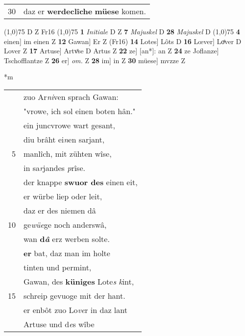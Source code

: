 \documentclass[8pt,a4paper,notitlepage]{article}
\begin{document}
\begin{table}[ht]
\begin{minipage}[t]{0.5\linewidth}
\begin{tabular}{rl}
30 & daz er \textbf{werdeclîche} \textbf{müese} komen.\\ 
\end{tabular}
\scriptsize
\line(1,0){75} \newline
D Z Fr16 \newline
\line(1,0){75} \newline
\textbf{1} \textit{Initiale} D Z  \textbf{7} \textit{Majuskel} D  \textbf{28} \textit{Majuskel} D  \newline
\line(1,0){75} \newline
\textbf{4} einen] im einen Z \textbf{12} Gawan] Er Z (Fr16) \textbf{14} Lotes] Lôts D \textbf{16} Lœver] Loͤver D Lover Z \textbf{17} Artuse] Artvͦse D Artus Z \textbf{22} ze] [an*]: an Z \textbf{24} ze Joflanze] Tschofflantze Z \textbf{26} er] \textit{om.} Z \textbf{28} im] in Z \textbf{30} müese] mvzze Z \newline
\end{minipage}
\hspace{0.5cm}
\begin{minipage}[t]{0.5\linewidth}
\small
\begin{center}*m
\end{center}
\begin{tabular}{rl}
 & zuo Ar\textit{ni}ven sprach Gawan:\\ 
 & "vrowe, ich sol einen boten hân."\\ 
 & ein juncvrowe wart gesant,\\ 
 & diu brâht ei\textit{n}en sarjant,\\ 
5 & manlîch, mit zühten wîse,\\ 
 & in sa\textit{r}jandes \textit{p}rîse.\\ 
 & der knappe \textbf{swuor des} einen eit,\\ 
 & er würbe liep oder leit,\\ 
 & daz er des niemen dâ\\ 
10 & ge\textit{wüe}ge noch anderswâ,\\ 
 & wan \textbf{d\textit{â}} erz werben solte.\\ 
 & \textbf{er} bat, daz man im holte\\ 
 & tinten und permint,\\ 
 & Gawan, des \textbf{küniges} Lote\textit{s} \textit{k}int,\\ 
15 & schreip gevuoge mit der hant.\\ 
 & er enbôt zuo Lo\textit{ve}r in daz lant\\ 
 & Artuse und d\textit{e}s wîbe\\ 

\end{tabular}
\end{minipage}
\end{table}
\end{document}
